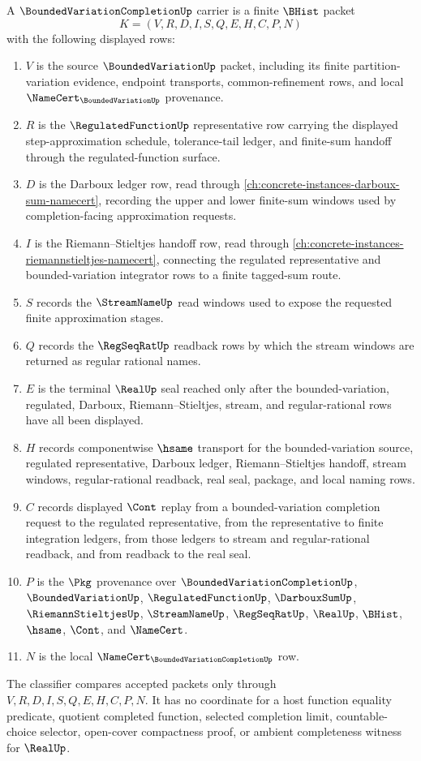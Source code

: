 \begin{definition}
\label{def:bounded-variation-completion-carrier}
A $\BoundedVariationCompletionUp$ carrier is a finite $\BHist$ packet
$$
K=(V,R,D,I,S,Q,E,H,C,P,N)
$$
with the following displayed rows:
\begin{enumerate}
\item $V$ is the source $\BoundedVariationUp$ packet, including its finite partition-variation evidence, endpoint transports, common-refinement rows, and local $\NameCert_{\BoundedVariationUp}$ provenance.
\item $R$ is the $\RegulatedFunctionUp$ representative row carrying the displayed step-approximation schedule, tolerance-tail ledger, and finite-sum handoff through the regulated-function surface.
\item $D$ is the Darboux ledger row, read through \autoref{ch:concrete-instances-darboux-sum-namecert}, recording the upper and lower finite-sum windows used by completion-facing approximation requests.
\item $I$ is the Riemann--Stieltjes handoff row, read through \autoref{ch:concrete-instances-riemannstieltjes-namecert}, connecting the regulated representative and bounded-variation integrator rows to a finite tagged-sum route.
\item $S$ records the $\StreamNameUp$ read windows used to expose the requested finite approximation stages.
\item $Q$ records the $\RegSeqRatUp$ readback rows by which the stream windows are returned as regular rational names.
\item $E$ is the terminal $\RealUp$ seal reached only after the bounded-variation, regulated, Darboux, Riemann--Stieltjes, stream, and regular-rational rows have all been displayed.
\item $H$ records componentwise $\hsame$ transport for the bounded-variation source, regulated representative, Darboux ledger, Riemann--Stieltjes handoff, stream windows, regular-rational readback, real seal, package, and local naming rows.
\item $C$ records displayed $\Cont$ replay from a bounded-variation completion request to the regulated representative, from the representative to finite integration ledgers, from those ledgers to stream and regular-rational readback, and from readback to the real seal.
\item $P$ is the $\Pkg$ provenance over $\BoundedVariationCompletionUp$, $\BoundedVariationUp$, $\RegulatedFunctionUp$, $\DarbouxSumUp$, $\RiemannStieltjesUp$, $\StreamNameUp$, $\RegSeqRatUp$, $\RealUp$, $\BHist$, $\hsame$, $\Cont$, and $\NameCert$.
\item $N$ is the local $\NameCert_{\BoundedVariationCompletionUp}$ row.
\end{enumerate}
The classifier compares accepted packets only through $V,R,D,I,S,Q,E,H,C,P,N$. It has no coordinate for a host function equality predicate, quotient completed function, selected completion limit, countable-choice selector, open-cover compactness proof, or ambient completeness witness for $\RealUp$.
\end{definition}
